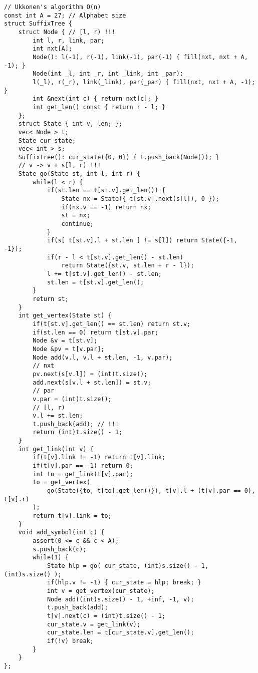 \documentclass[12pt]{article}
\begin{document}
\begin{verbatim}
// Ukkonen's algorithm O(n)
const int A = 27; // Alphabet size
struct SuffixTree {
    struct Node { // [l, r) !!!
        int l, r, link, par;
        int nxt[A];
        Node(): l(-1), r(-1), link(-1), par(-1) { fill(nxt, nxt + A, -1); }
        Node(int _l, int _r, int _link, int _par): 
        l(_l), r(_r), link(_link), par(_par) { fill(nxt, nxt + A, -1); }
        int &next(int c) { return nxt[c]; }
        int get_len() const { return r - l; }
    };
    struct State { int v, len; };
    vec< Node > t;
    State cur_state;
    vec< int > s;
    SuffixTree(): cur_state({0, 0}) { t.push_back(Node()); }
    // v -> v + s[l, r) !!!
    State go(State st, int l, int r) {
        while(l < r) {
            if(st.len == t[st.v].get_len()) {
                State nx = State({ t[st.v].next(s[l]), 0 });
                if(nx.v == -1) return nx;
                st = nx;
                continue;
            }
            if(s[ t[st.v].l + st.len ] != s[l]) return State({-1, -1});
            if(r - l < t[st.v].get_len() - st.len) 
                return State({st.v, st.len + r - l});
            l += t[st.v].get_len() - st.len;
            st.len = t[st.v].get_len();
        }
        return st;
    }
    int get_vertex(State st) {
        if(t[st.v].get_len() == st.len) return st.v;
        if(st.len == 0) return t[st.v].par;
        Node &v = t[st.v];
        Node &pv = t[v.par];
        Node add(v.l, v.l + st.len, -1, v.par);
        // nxt
        pv.next(s[v.l]) = (int)t.size();
        add.next(s[v.l + st.len]) = st.v;
        // par
        v.par = (int)t.size();
        // [l, r)
        v.l += st.len;
        t.push_back(add); // !!!
        return (int)t.size() - 1;
    }
    int get_link(int v) {
        if(t[v].link != -1) return t[v].link;
        if(t[v].par == -1) return 0;
        int to = get_link(t[v].par);
        to = get_vertex(
            go(State({to, t[to].get_len()}), t[v].l + (t[v].par == 0), t[v].r)
        );
        return t[v].link = to;
    }
    void add_symbol(int c) {
        assert(0 <= c && c < A);
        s.push_back(c);
        while(1) {
            State hlp = go( cur_state, (int)s.size() - 1, (int)s.size() );
            if(hlp.v != -1) { cur_state = hlp; break; }
            int v = get_vertex(cur_state);
            Node add((int)s.size() - 1, +inf, -1, v);
            t.push_back(add);
            t[v].next(c) = (int)t.size() - 1;
            cur_state.v = get_link(v);
            cur_state.len = t[cur_state.v].get_len();
            if(!v) break;
        }
    }
};
\end{verbatim}
\end{document}
